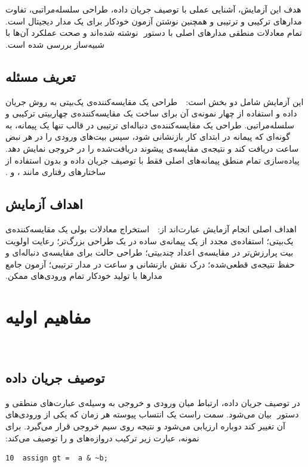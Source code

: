 ‫
‫هدف این آزمایش، آشنایی عملی با توصیف جریان داده، طراحی
‫سلسله‌مراتبی، تفاوت مدارهای ترکیبی و ترتیبی و همچنین نوشتن
‫آزمون خودکار برای یک مدار دیجیتال است. تمام معادلات منطقی مدارهای اصلی با دستور
‫ نوشته شده‌اند و صحت عملکرد آن‌ها با شبیه‌ساز  بررسی شده است.
‫
‫
‫\subsection{تعریف مسئله}
‫
‫این آزمایش شامل دو بخش است:
‫
‫
‫ طراحی یک مقایسه‌کننده‌ی یک‌بیتی به روش جریان داده و استفاده از چهار نمونه‌ی آن برای
‫ساخت یک مقایسه‌کننده‌ی چهاربیتی ترکیبی و سلسله‌مراتبی.
‫ طراحی یک مقایسه‌کننده‌ی دنباله‌ای ترتیبی در قالب تنها یک پیمانه، به گونه‌ای که پیمانه
‫در ابتدای کار بازنشانی شود، سپس بیت‌های ورودی را در هر نبض ساعت دریافت کند و نتیجه‌ی
‫مقایسه‌ی پیشوند دریافت‌شده را در خروجی نمایش دهد.
‫ پیاده‌سازی تمام منطق پیمانه‌های اصلی فقط با توصیف جریان داده و بدون استفاده از
‫ساختارهای رفتاری مانند ،  و .
‫
‫
‫
‫\subsection{اهداف آزمایش}
‫
‫اهداف اصلی انجام آزمایش عبارت‌اند از:
‫
‫
‫ استخراج معادلات بولی یک مقایسه‌کننده‌ی یک‌بیتی؛
‫ استفاده‌ی مجدد از یک پیمانه‌ی ساده در یک طراحی بزرگ‌تر؛
‫ رعایت اولویت بیت پرارزش‌تر در مقایسه‌ی اعداد چندبیتی؛
‫ طراحی حالت برای مقایسه‌ی دنباله‌ای و حفظ نتیجه‌ی قطعی‌شده؛
‫ درک نقش بازنشانی و ساعت در مدار ترتیبی؛
‫ آزمون جامع مدارها با تولید خودکار تمام ورودی‌های ممکن.
‫
‫
‫
‫\section{مفاهیم اولیه}
‫
‫
‫\subsection{توصیف جریان داده}
‫
‫در توصیف جریان داده، ارتباط میان ورودی و خروجی به وسیله‌ی عبارت‌های منطقی و دستور
‫ بیان می‌شود. سمت راست یک انتساب پیوسته هر زمان که یکی از ورودی‌های آن تغییر
‫کند دوباره ارزیابی می‌شود و نتیجه روی سیم خروجی قرار می‌گیرد. برای نمونه، عبارت زیر
‫ترکیب دروازه‌های  و  را توصیف می‌کند:
‫
\begin{dsdlcodeblock}
\begin{verbatim}
10  assign gt =  a & ~b;
\end{verbatim}
\end{dsdlcodeblock}
